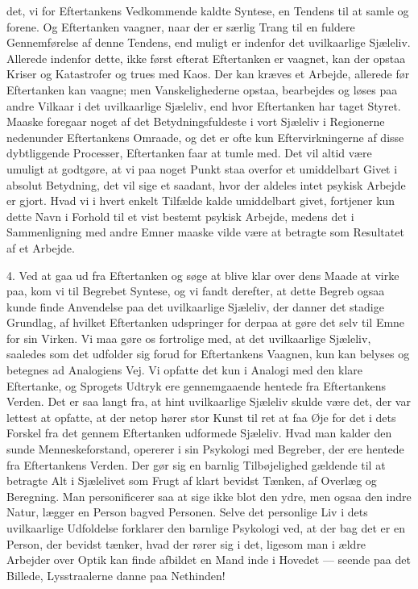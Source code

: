 \documentclass[12pt,a4paper]{book}
\newcommand{\apage}[1]{\marginnote{\footnotesize\textit{[#1]}}}
\begin{document}
det, vi for Eftertankens Vedkommende kaldte Syntese, en Tendens til at
samle og forene. Og Eftertanken vaagner, naar der er særlig Trang til
en fuldere Gennemførelse af denne Tendens, end muligt er indenfor det
uvilkaarlige Sjæleliv. Allerede indenfor dette, ikke først efterat
Eftertanken er vaagnet, kan der opstaa Kriser og Katastrofer og trues
med Kaos. Der kan kræves et Arbejde, allerede før Eftertanken kan
vaagne; men Vanskelighederne opstaa, bearbejdes og løses paa andre
Vilkaar i det uvilkaarlige Sjæleliv, end hvor Eftertanken har taget
Styret. Maaske foregaar noget af det Betydningsfuldeste i vort
Sjæleliv i Regionerne nedenunder Eftertankens Omraade, og det er ofte
kun Eftervirkningerne af disse dybtliggende Processer, Eftertanken faar at tumle med. Det vil altid være umuligt at godtgøre, at vi paa noget
Punkt staa overfor et umiddelbart Givet i absolut Betydning, det vil
sige et saadant, hvor der aldeles intet psykisk Arbejde er gjort. Hvad
vi i hvert enkelt Tilfælde kalde umiddelbart givet, fortjener kun
dette Navn i Forhold til et vist bestemt psykisk Arbejde, medens det i
Sammenligning med andre Emner maaske vilde være at betragte som
Resultatet af et Arbejde.

4. Ved at gaa ud fra Eftertanken og søge at blive klar over dens Maade
at virke paa, kom vi til Begrebet Syntese, og vi fandt derefter, at
dette Begreb ogsaa kunde finde Anvendelse paa det uvilkaarlige
Sjæleliv, der danner det stadige Grundlag, af hvilket Eftertanken
udspringer for derpaa \apage{11} at gøre det selv til Emne for sin Virken. Vi maa
gøre os fortrolige med, at det uvilkaarlige Sjæleliv, saaledes som det
udfolder sig forud for Eftertankens Vaagnen, kun kan belyses og
betegnes ad Analogiens Vej. Vi opfatte det kun i Analogi med den klare
Eftertanke, og Sprogets Udtryk ere gennemgaaende hentede fra
Eftertankens Verden. Det er saa langt fra, at hint uvilkaarlige
Sjæleliv skulde være det, der var lettest at opfatte, at der netop
hører stor Kunst til ret at faa Øje for det i dets Forskel fra det
gennem Eftertanken udformede Sjæleliv. Hvad man kalder den sunde
Menneskeforstand, opererer i sin Psykologi med Begreber, der ere
hentede fra Eftertankens Verden. Der gør sig en barnlig Tilbøjelighed
gældende til at betragte Alt i Sjælelivet som Frugt af klart bevidst
Tænken, af Overlæg og Beregning. Man personificerer saa at sige ikke
blot den ydre, men ogsaa den indre Natur, lægger en Person bagved
Personen. Selve det personlige Liv i dets uvilkaarlige Udfoldelse
forklarer den barnlige Psykologi ved, at der bag det er en Person, der
bevidst tænker, hvad der rører sig i det, ligesom man i ældre Arbejder
over Optik kan finde afbildet en Mand inde i Hovedet --- seende paa
det Billede, Lysstraalerne danne paa Nethinden!
\end{document}
